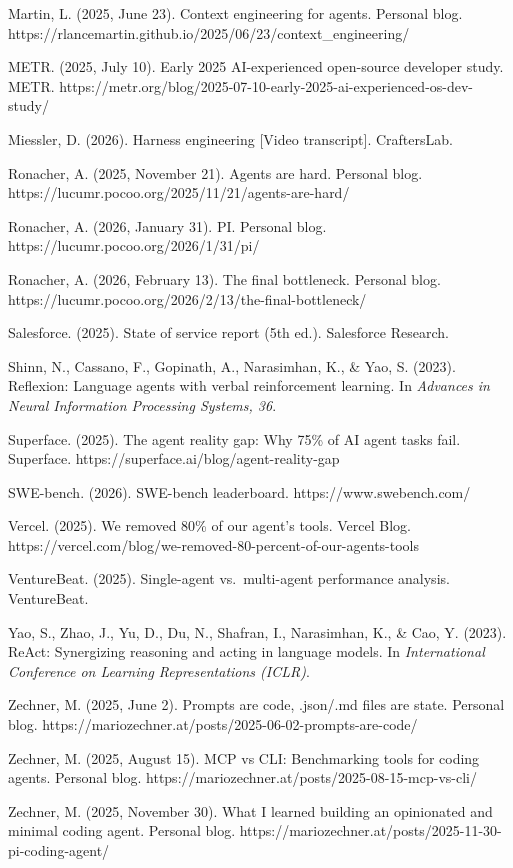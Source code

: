 \documentclass[11pt, a4paper]{article}
\begin{document}
Martin, L. (2025, June 23). Context engineering for agents. Personal
blog. https://rlancemartin.github.io/2025/06/23/context\_engineering/

METR. (2025, July 10). Early 2025 AI-experienced open-source developer
study. METR.
https://metr.org/blog/2025-07-10-early-2025-ai-experienced-os-dev-study/

Miessler, D. (2026). Harness engineering {[}Video transcript{]}.
CraftersLab.

Ronacher, A. (2025, November 21). Agents are hard. Personal blog.
https://lucumr.pocoo.org/2025/11/21/agents-are-hard/

Ronacher, A. (2026, January 31). PI. Personal blog.
https://lucumr.pocoo.org/2026/1/31/pi/

Ronacher, A. (2026, February 13). The final bottleneck. Personal blog.
https://lucumr.pocoo.org/2026/2/13/the-final-bottleneck/

Salesforce. (2025). State of service report (5th ed.). Salesforce
Research.

Shinn, N., Cassano, F., Gopinath, A., Narasimhan, K., \& Yao, S. (2023).
Reflexion: Language agents with verbal reinforcement learning. In
\emph{Advances in Neural Information Processing Systems, 36}.

Superface. (2025). The agent reality gap: Why 75\% of AI agent tasks
fail. Superface. https://superface.ai/blog/agent-reality-gap

SWE-bench. (2026). SWE-bench leaderboard. https://www.swebench.com/

Vercel. (2025). We removed 80\% of our agent's tools. Vercel Blog.
https://vercel.com/blog/we-removed-80-percent-of-our-agents-tools

VentureBeat. (2025). Single-agent vs.~multi-agent performance analysis.
VentureBeat.

Yao, S., Zhao, J., Yu, D., Du, N., Shafran, I., Narasimhan, K., \& Cao,
Y. (2023). ReAct: Synergizing reasoning and acting in language models.
In \emph{International Conference on Learning Representations (ICLR)}.

Zechner, M. (2025, June 2). Prompts are code, .json/.md files are state.
Personal blog.
https://mariozechner.at/posts/2025-06-02-prompts-are-code/

Zechner, M. (2025, August 15). MCP vs CLI: Benchmarking tools for coding
agents. Personal blog.
https://mariozechner.at/posts/2025-08-15-mcp-vs-cli/

Zechner, M. (2025, November 30). What I learned building an opinionated
and minimal coding agent. Personal blog.
https://mariozechner.at/posts/2025-11-30-pi-coding-agent/
\end{document}
